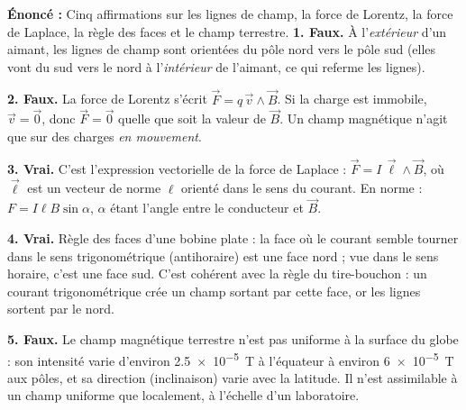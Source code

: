 \documentclass[11pt]{article}
\newcommand{\cle}[1]{{\popxbold\color{popdark}#1}}
\begin{document}
\begin{corrige}
\textbf{Énoncé :} Cinq affirmations sur les lignes de champ, la force de Lorentz, la force de Laplace, la règle des faces et le champ terrestre.
\tcblower
\textbf{1. Faux.} À l'\emph{extérieur} d'un aimant, les lignes de champ sont orientées du pôle \cle{nord vers le pôle sud} (elles vont du sud vers le nord à l'\emph{intérieur} de l'aimant, ce qui referme les lignes).

\textbf{2. Faux.} La force de Lorentz s'écrit $\vec{F} = q\,\vec{v}\wedge\vec{B}$. Si la charge est immobile, $\vec{v} = \vec{0}$, donc $\vec{F} = \vec{0}$ quelle que soit la valeur de $\vec{B}$. Un champ magnétique n'agit que sur des charges \emph{en mouvement}.

\textbf{3. Vrai.} C'est l'expression vectorielle de la \cle{force de Laplace} : $\vec{F} = I\,\vec{\ell}\wedge\vec{B}$, où $\vec{\ell}$ est un vecteur de norme $\ell$ orienté dans le sens du courant. En norme : $F = I\ell B \sin\alpha$, $\alpha$ étant l'angle entre le conducteur et $\vec{B}$.

\textbf{4. Vrai.} Règle des faces d'une bobine plate : la face où le courant semble tourner dans le \cle{sens trigonométrique} (antihoraire) est une face \cle{nord} ; vue dans le sens horaire, c'est une face sud. C'est cohérent avec la règle du tire-bouchon : un courant trigonométrique crée un champ sortant par cette face, or les lignes sortent par le nord.

\textbf{5. Faux.} Le champ magnétique terrestre n'est \cle{pas uniforme} à la surface du globe : son intensité varie d'environ \SI{2,5e-5}{T} à l'équateur à environ \SI{6e-5}{T} aux pôles, et sa direction (inclinaison) varie avec la latitude. Il n'est assimilable à un champ uniforme que localement, à l'échelle d'un laboratoire.
\end{corrige}
\end{document}
